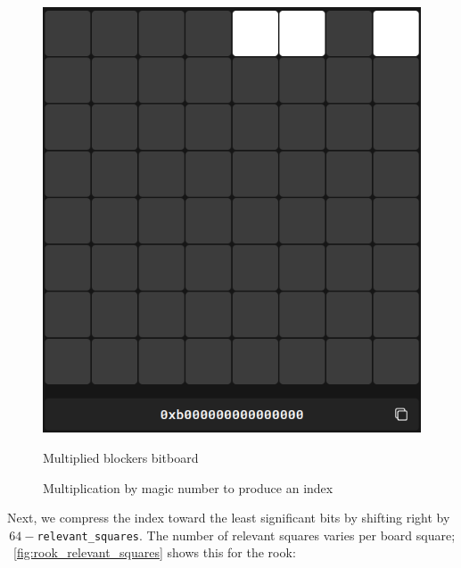 \begin{figure}
\begin{minipage}[c]{0.4\textwidth}
        \includegraphics[width=\textwidth]{Imagenes/magics_multiplied_blockers.png}
        \caption{Multiplied blockers bitboard}
    \end{minipage}
    \caption{Multiplication by magic number to produce an index}\label{fig:magic_multiplication}
\end{figure}

\noindent Next, we compress the index toward the least significant bits by shifting right by \(\,64-\)\texttt{relevant\_squares}. The number of relevant squares varies per board square; ~\cref{fig:rook_relevant_squares} shows this for the rook:

\vspace{1em}

